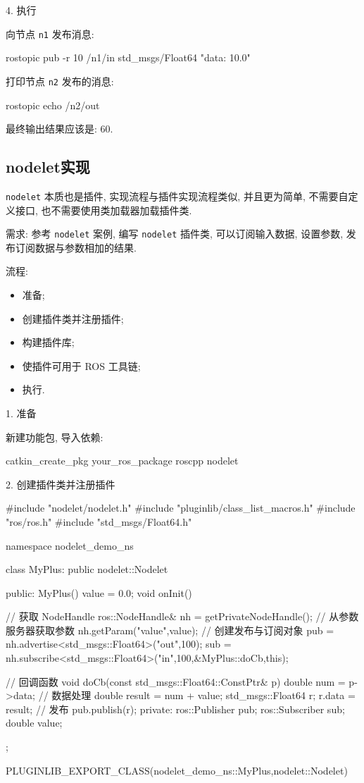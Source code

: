 \documentclass[openany, fontset=windowsold]{ctexbook}
\theoremstyle{kaiti}
\theoremstyle{normal}
\begin{document}
4. 执行

向节点 \verb|n1| 发布消息:

\begin{bash}
  rostopic pub -r 10 /n1/in std_msgs/Float64 "data: 10.0"
\end{bash}

打印节点 \verb|n2| 发布的消息:

\begin{bash}
  rostopic echo /n2/out
\end{bash}

最终输出结果应该是: 60.

\subsection{nodelet实现}

\verb|nodelet| 本质也是插件, 实现流程与插件实现流程类似, 并且更为简单, 不需要自定义接口, 也不需要使用类加载器加载插件类.

需求: 参考 \verb|nodelet| 案例, 编写 \verb|nodelet| 插件类, 可以订阅输入数据, 设置参数, 发布订阅数据与参数相加的结果.

流程:

\begin{itemize}
  \item 准备; 
  \item 创建插件类并注册插件;
  \item 构建插件库;
  \item 使插件可用于 ROS 工具链; 
  \item 执行.
\end{itemize}

1. 准备

新建功能包, 导入依赖:

\begin{bash}
  catkin_create_pkg your_ros_package roscpp nodelet
\end{bash}

2. 创建插件类并注册插件

\begin{cpp}
  #include "nodelet/nodelet.h"
  #include "pluginlib/class_list_macros.h"
  #include "ros/ros.h"
  #include "std_msgs/Float64.h"

  namespace nodelet_demo_ns {
  class MyPlus: public nodelet::Nodelet {
      public:
      MyPlus(){
          value = 0.0;
      }
      void onInit(){
          // 获取 NodeHandle
          ros::NodeHandle& nh = getPrivateNodeHandle();
          // 从参数服务器获取参数
          nh.getParam("value",value);
          // 创建发布与订阅对象
          pub = nh.advertise<std_msgs::Float64>("out",100);
          sub = nh.subscribe<std_msgs::Float64>("in",100,&MyPlus::doCb,this);

      }
      // 回调函数
      void doCb(const std_msgs::Float64::ConstPtr& p){
          double num = p->data;
          // 数据处理
          double result = num + value;
          std_msgs::Float64 r;
          r.data = result;
          // 发布
          pub.publish(r);
      }
      private:
      ros::Publisher pub;
      ros::Subscriber sub;
      double value;

  };
  }
  PLUGINLIB_EXPORT_CLASS(nodelet_demo_ns::MyPlus,nodelet::Nodelet)
\end{cpp}
\end{document}
